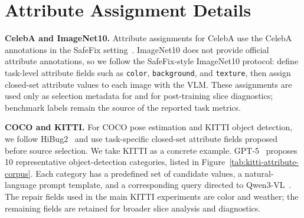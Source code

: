 \section{Attribute Assignment Details}
\label{app:attribute-assignment-details}

\noindent\textbf{CelebA and ImageNet10.}
Attribute assignments for CelebA use the CelebA annotations in the SafeFix setting~\citep{xu2025safefix}. ImageNet10 does not provide official attribute annotations, so we follow the SafeFix-style ImageNet10 protocol: define task-level attribute fields such as \texttt{color}, \texttt{background}, and \texttt{texture}, then assign closed-set attribute values to each image with the VLM. These assignments are used only as selection metadata for \model and for post-training slice diagnostics; benchmark labels remain the source of the reported task metrics.

\noindent\textbf{COCO and KITTI.}
For COCO pose estimation and KITTI object detection, we follow HiBug2~\citep{chen2025hibug2} and use task-specific closed-set attribute fields proposed before source selection. We take KITTI as a concrete example. GPT-5~\citep{openai2025gpt5} proposes 10 representative object-detection categories, listed in Figure~\ref{tab:kitti-attribute-corpus}. Each category has a predefined set of candidate values, a natural-language prompt template, and a corresponding query directed to Qwen3-VL~\citep{bai2025qwen3vl}. The repair fields used in the main KITTI experiments are color and weather; the remaining fields are retained for broader slice analysis and diagnostics.

